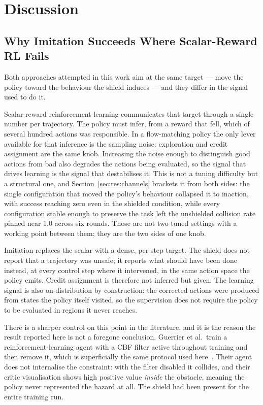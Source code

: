 \documentclass[a4paper,11pt]{report}
\begin{document}
\chapter{Discussion}\label{ch:discussion}

\section{Why Imitation Succeeds Where Scalar-Reward RL Fails}\label{sec:disc:mechanism}

Both approaches attempted in this work aim at the same target --- move the policy toward the
behaviour the shield induces --- and they differ in the signal used to do it.

Scalar-reward reinforcement learning communicates that target through a single number per
trajectory. The policy must infer, from a reward that fell, which of several hundred actions was
responsible. In a flow-matching policy the only lever available for that inference is the sampling
noise: exploration and credit assignment are the same knob. Increasing the noise enough to
distinguish good actions from bad also degrades the actions being evaluated, so the signal that
drives learning is the signal that destabilises it. This is not a tuning difficulty but a
structural one, and Section~\ref{sec:res:channels} brackets it from both sides: the single
configuration that moved the policy's behaviour collapsed it to inaction, with success reaching
zero even in the shielded condition, while every configuration stable enough to preserve the task
left the unshielded collision rate pinned near 1.0 across six rounds. Those are not two tuned
settings with a working point between them; they are the two sides of one knob.

Imitation replaces the scalar with a dense, per-step target. The shield does not report that a
trajectory was unsafe; it reports what should have been done instead, at every control step where
it intervened, in the same action space the policy emits. Credit assignment is therefore not
inferred but given. The learning signal is also on-distribution by construction: the corrected
actions were produced from states the policy itself visited, so the supervision does not require
the policy to be evaluated in regions it never reaches.

There is a sharper control on this point in the literature, and it is the reason the result
reported here is not a foregone conclusion. Guerrier et al.\ train a reinforcement-learning agent
with a CBF filter active throughout training and then remove it, which is superficially the same
protocol used here~\cite{guerrier2025guardrails}. Their agent does not internalise the constraint:
with the filter disabled it collides, and their critic visualisation shows high positive value
\emph{inside} the obstacle, meaning the policy never represented the hazard at all. The shield had
been present for the entire training run.
\end{document}
